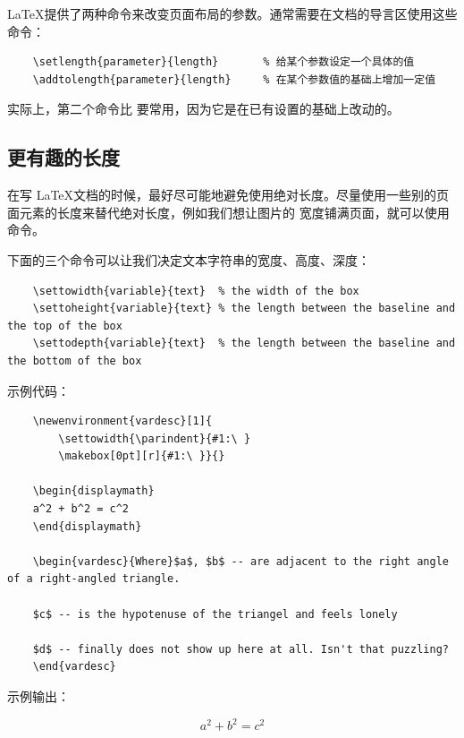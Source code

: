 \documentclass[UTF8]{ctexart}
\begin{document}
\LaTeX 提供了两种命令来改变页面布局的参数。通常需要在文档的导言区使用这些命令：
\begin{verbatim}
    \setlength{parameter}{length}       % 给某个参数设定一个具体的值
    \addtolength{parameter}{length}     % 在某个参数值的基础上增加一定值
\end{verbatim}

实际上，第二个命令比 \texttt{\setlength} 要常用，因为它是在已有设置的基础上改动的。

\subsection{更有趣的长度}
在写 \LaTeX 文档的时候，最好尽可能地避免使用绝对长度。尽量使用一些别的页面元素的长度来替代绝对长度，例如我们想让图片的
宽度铺满页面，就可以使用 \texttt{\textwidth} 命令。

下面的三个命令可以让我们决定文本字符串的宽度、高度、深度：
\begin{verbatim}
    \settowidth{variable}{text}  % the width of the box
    \settoheight{variable}{text} % the length between the baseline and the top of the box
    \settodepth{variable}{text}  % the length between the baseline and the bottom of the box
\end{verbatim}

示例代码：
\begin{verbatim}
    \newenvironment{vardesc}[1]{
        \settowidth{\parindent}{#1:\ }
        \makebox[0pt][r]{#1:\ }}{}

    \begin{displaymath}
    a^2 + b^2 = c^2
    \end{displaymath}

    \begin{vardesc}{Where}$a$, $b$ -- are adjacent to the right angle of a right-angled triangle.

    $c$ -- is the hypotenuse of the triangel and feels lonely

    $d$ -- finally does not show up here at all. Isn't that puzzling?
    \end{vardesc}
\end{verbatim}

示例输出：
\newenvironment{vardesc}[1]{
    \settowidth{\parindent}{#1:\ }
    \makebox[0pt][r]{#1:\ }}{}

\begin{displaymath}
a^2 + b^2 = c^2
\end{displaymath}
\end{document}
